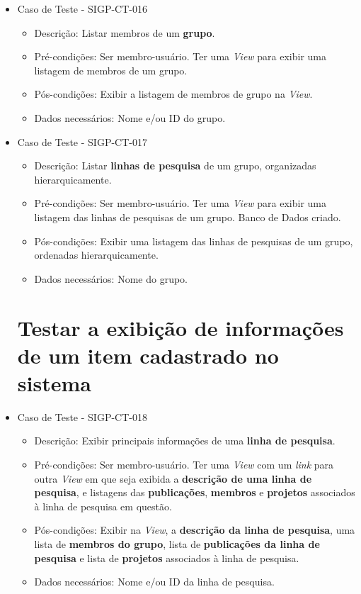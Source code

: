 \documentclass[11pt, a4paper]{book}
\begin{document}
\begin{itemize}
	\item Caso de Teste - SIGP-CT-016
	\begin{itemize}
	\item Descrição: Listar membros de um \textbf{grupo}.
	\item Pré-condições: Ser membro-usuário. Ter uma \emph{View} para exibir uma listagem de membros de um grupo.
	\item Pós-condições: Exibir a listagem de membros de grupo na \emph{View}.
	\item Dados necessários: Nome  e/ou ID do grupo.
	\end{itemize}

	\item Caso de Teste - SIGP-CT-017
	\begin{itemize}
	\item Descrição: Listar \textbf{linhas de pesquisa} de um grupo, organizadas hierarquicamente.
	\item Pré-condições: Ser membro-usuário. Ter uma \emph{View} para exibir uma listagem das linhas de pesquisas de um grupo. Banco de Dados criado.
	\item Pós-condições: Exibir uma listagem das linhas de pesquisas de um grupo, ordenadas hierarquicamente.
	\item Dados necessários: Nome do grupo. 
	\end{itemize}


\newpage
\section{Testar a exibição de informações de um item cadastrado no sistema}

	\item Caso de Teste - SIGP-CT-018
	\begin{itemize}
	\item Descrição: Exibir principais informações de uma \textbf{linha de pesquisa}.
	\item Pré-condições: Ser membro-usuário. Ter uma \emph{View} com um \emph{link} para outra \emph{View} em que seja exibida a \textbf{descrição de uma linha de pesquisa}, e listagens das \textbf{publicações}, \textbf{membros} e \textbf{projetos} associados à linha de pesquisa em questão.
	\item Pós-condições: Exibir na \emph{View}, a \textbf{descrição da linha de pesquisa}, uma lista de \textbf{membros do grupo}, lista de \textbf{publicações da linha de pesquisa} e lista de \textbf{projetos} associados à linha de pesquisa.
	\item Dados necessários: Nome e/ou ID da linha de pesquisa.
	\end{itemize}


\end{itemize}
\end{document}
